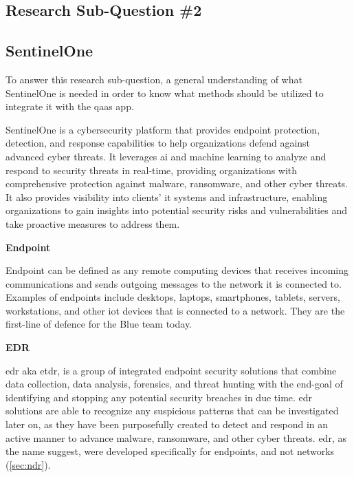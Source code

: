 \begin{multicols}{2}
      \section{Research Sub-Question \#2}
      \subsection{SentinelOne} %
      To answer this research sub-question, a general understanding of what SentinelOne is needed in order to know what
      methods should be utilized to integrate it with the \acrshort{qaas} app.

      SentinelOne is a cybersecurity platform that provides endpoint protection, detection, and response capabilities to
      help organizations defend against advanced cyber threats. It leverages \acrlong{ai} and machine learning to analyze
      and respond to security threats in real-time, providing organizations with comprehensive protection against malware,
      ransomware, and other cyber threats. It also provides visibility into clients' \acrshort{it} systems and infrastructure,
      enabling organizations to gain insights into potential security risks and vulnerabilities and take proactive measures
      to address them.

      \textbf{Endpoint}

      Endpoint can be defined as any remote computing devices that receives incoming communications and sends outgoing messages
      to the network it is connected to. Examples of endpoints include desktops, laptops, smartphones, tablets, servers, workstations,
      and other \acrshort{iot} devices that is connected to a network. They are the first-line of defence for the Blue team today.

      \textbf{EDR}

      \acrshort{edr} \acrshort{aka} \acrshort{etdr}, is a group of integrated endpoint security solutions that combine data collection,
      data analysis, forensics, and threat hunting with the end-goal of identifying and stopping any potential security breaches in due time.
      \acrshort{edr} solutions are able to recognize any suspicious patterns that can be investigated later on, as they have been purposefully
      created to detect and respond in an active manner to advance malware, ransomware, and other cyber threats. \acrshort{edr}, as the name
      suggest, were developed specifically for endpoints, and not networks (\ref{sec:ndr}).


\end{multicols}
